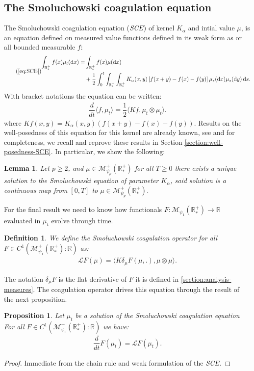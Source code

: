 \documentclass[11pt,a4paper]{article}
\newcommand{\RR}{\mathbb{R}}
\newcommand{\RRP}{\mathbb{R}^+_*}
\newcommand{\MC}{\mathcal{M}}
\newcommand{\LC}{\mathcal{L}}
\newcommand{\SCE}{\emph{SCE}}
\newcommand{\dd}{\mathop{}\!\mathrm{d}}
\newtheorem{lemma}[theorem]{Lemma}
\newtheorem{proposition}[theorem]{Proposition}
\newtheorem{definition}[theorem]{Definition}
\begin{document}
\subsection{The Smoluchowski coagulation equation}
The Smoluchowski coagulation equation ($\SCE$) of kernel $K_\alpha$ and intial value $\mu$, is an equation defined on measured value functions defined in its weak form as or all bounded measurable $f$:
\begin{equation}\tag{\ref{eq:SCE}}
\begin{aligned}
    \int_{\RRP} f(x)\mu_t (\dd x) =& \int_{\RRP} f(x)\mu (\dd x)\\
     &+ \dfrac12\int_0^t \int_{\RRP}\int_{\RRP} 
        K_{\alpha}(x,y)\left[f(x+y) - f(x) - f(y)\right] \mu_s(\dd x)\mu_s(\dd y) \dd s.
\end{aligned}
\end{equation}
With bracket notations the equation can be written:
\begin{align*}
    \dfrac{d}{dt}\langle f,\mu_t \rangle = \dfrac12\langle Kf , \mu_t \otimes \mu_t\rangle.
\end{align*}
where $Kf(x,y) = K_{\alpha}(x,y)\left(f(x+y) - f(x) - f(y) \right)$. Results on the well-posedness of this equation for this kernel are already known, see \cite{norris1999Smoluchowski} and for completeness, we recall and reprove these results in Section \ref{section:well-posedness-SCE}. In particular, we show the following:
\begin{lemma}\label{lem:well_posedness_smol_eq}
    Let $p \geq 2$, and $\mu \in \MC_{\psi_p}^+ (\RRP)$ for all $T \geq 0$ there exists a unique solution to the Smoluchowski equation of parameter $K_\alpha$, said solution is a continuous map from $[0,T]$ to $\mu \in \MC_{\psi_p}^+ (\RRP)$.
\end{lemma}
For the final result we need to know how functionals $F : \MC_{\psi_1}(\RRP) \to \RR$ evaluated in $\mu_t$ evolve through time.
\begin{definition}
    We define the Smoluchowski coagulation operator for all $F \in C^1(\MC^+_{\psi_1}\left(\RRP\right):\RR)$ as:
    \begin{align*}
        \LC F(\mu) = \langle K\delta_\mu F(\mu,.) , \mu\otimes \mu\rangle.
    \end{align*}
\end{definition}
The notation $\delta_\mu F$ is the flat derivative of $F$ it is defined in \ref{section:analysis-measures}. The coagulation operator drives this equation through the result of the next proposition.
\begin{proposition}
    Let $\mu_t$ be a solution of the Smoluchowski coagulation equation For all $F \in C^1(\MC_{\psi_1}^+\left(\RRP \right):\RR)$ we have:
    \begin{align*}
        \dfrac{d}{dt} F( \mu_t) = \LC F(\mu_t).
    \end{align*}
\end{proposition}
\begin{proof}
    Immediate from the chain rule and weak formulation of the $\SCE$.
\end{proof}
    
\end{document}
